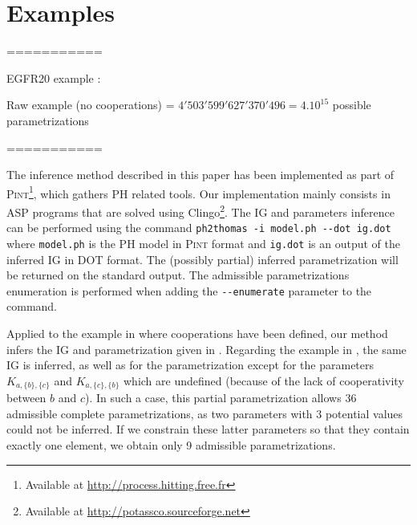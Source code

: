 \section{Examples}\label{sec:examples}



===========

EGFR20 example :

Raw example (no cooperations) = $4'503'599'627'370'496 = 4.10^{15}$ possible parametrizations

===========

The inference method described in this paper has been implemented as part of
\textsc{Pint}\footnote{Available at \url{http://process.hitting.free.fr}}, which gathers PH related
tools.
Our implementation mainly consists in ASP programs that are solved using Clingo\footnote{Available
at \url{http://potassco.sourceforge.net}}.
The IG and parameters inference can be performed using the command
\texttt{ph2thomas -i model.ph -{}-dot ig.dot}
where \texttt{model.ph} is the PH model in \textsc{Pint} format and \texttt{ig.dot} is an output of the inferred IG in DOT format.
The (possibly partial) inferred parametrization will be returned on the standard output.
The admissible parametrizations enumeration is performed when adding the \texttt{-{}-enumerate}
parameter to the command.

Applied to the example in  where cooperations have been defined,
our method infers the IG and parametrization given in .
Regarding the example in , the same IG is inferred, as well as for the
parametrization except for the parameters $K_{a,\{b\},\{c\}}$ and $K_{a,\{c\},\{b\}}$ which are
undefined (because of the lack of cooperativity between $b$ and $c$).
In such a case, this partial parametrization allows 36 admissible complete parametrizations, as two
parameters with 3 potential values could not be inferred.
If we constrain these latter parameters so that they contain exactly one element, we obtain only 9
admissible parametrizations.

